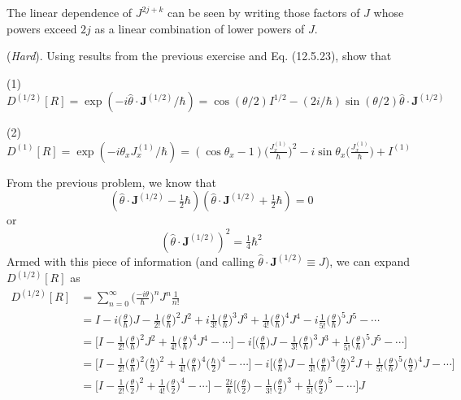 \documentclass[../principles-of-quantum-mechanics.tex]{subfiles}
\begin{document}
\begin{questions}
\begin{solution}
			The linear dependence of $J^{2j + k}$ can be seen by writing those factors of $J$ whose powers exceed $2j$ as a linear combination of lower powers of $J$.
		\end{solution}
		
		\question (\textit{Hard}). Using results from the previous exercise and Eq. (12.5.23), show that
		
		(1) $D^{(1/2)}[R] = \exp(-i\hat{\theta}\cdot\mathbf{J}^{(1/2)}/\hbar) = \cos(\theta/2)I^{1/2} - (2i/\hbar)\sin(\theta/2)\hat{\theta}\cdot\mathbf{J}^{(1/2)}$
		
		(2) $D^{(1)}[R] = \exp(-i\theta_xJ_x^{(1)}/\hbar) = (\cos\theta_x - 1)\Big(\frac{J_x^{(1)}}{\hbar}\Big)^2 - i\sin\theta_x\Big(\frac{J_x^{(1)}}{\hbar}\Big) + I^{(1)}$
		
		\begin{solution}
			From the previous problem, we know that
			$$(\hat{\theta}\cdot\mathbf{J}^{(1/2)} - \tfrac{1}{2}\hbar)(\hat{\theta}\cdot\mathbf{J}^{(1/2)} + \tfrac{1}{2}\hbar) = 0$$
			or
			$$(\hat{\theta}\cdot\mathbf{J}^{(1/2)})^2 = \tfrac{1}{4}\hbar^2$$
			Armed with this piece of information (and calling $\hat{\theta}\cdot\mathbf{J}^{(1/2)} \equiv J$), we can expand $D^{(1/2)}[R]$ as
			\begin{align*}
				D^{(1/2)}[R] &= \sum_{n=0}^{\infty}\Big({\frac{-i\theta}{\hbar}}\Big)^nJ^n\frac{1}{n!} \\
				&= I - i\Big(\frac{\theta}{\hbar}\Big)J - \frac{1}{2!}\Big(\frac{\theta}{\hbar}\Big)^2J^2 + i\frac{1}{3!}\Big(\frac{\theta}{\hbar}\Big)^3J^3 + \frac{1}{4!}\Big(\frac{\theta}{\hbar}\Big)^4J^4 - i\frac{1}{5!}\Big(\frac{\theta}{\hbar}\Big)^5J^5 - \cdots \\
				&= \Big[I - \frac{1}{2!}\Big(\frac{\theta}{\hbar}\Big)^2J^2 + \frac{1}{4!}\Big(\frac{\theta}{\hbar}\Big)^4J^4 - \cdots\Big] - i\Big[\Big(\frac{\theta}{\hbar}\Big)J - \frac{1}{3!}\Big(\frac{\theta}{\hbar}\Big)^3J^3 + \frac{1}{5!}\Big(\frac{\theta}{\hbar}\Big)^5J^5 - \cdots\Big] \\
				&= \Big[I - \frac{1}{2!}\Big(\frac{\theta}{\hbar}\Big)^2\Big(\frac{\hbar}{2}\Big)^2 + \frac{1}{4!}\Big(\frac{\theta}{\hbar}\Big)^4\Big(\frac{\hbar}{2}\Big)^4 - \cdots\Big] - i\Big[\Big(\frac{\theta}{\hbar}\Big)J - \frac{1}{3!}\Big(\frac{\theta}{\hbar}\Big)^3\Big(\frac{\hbar}{2}\Big)^2J + \frac{1}{5!}\Big(\frac{\theta}{\hbar}\Big)^5\Big(\frac{\hbar}{2}\Big)^4J - \cdots\Big] \\
				&= \Big[I - \frac{1}{2!}\Big(\frac{\theta}{2}\Big)^2 + \frac{1}{4!}\Big(\frac{\theta}{2}\Big)^4 - \cdots\Big] - \frac{2i}{\hbar}\Big[\Big(\frac{\theta}{2}\Big) - \frac{1}{3!}\Big(\frac{\theta}{2}\Big)^3 + \frac{1}{5!}\Big(\frac{\theta}{2}\Big)^5 - \cdots \Big]J \\

\end{align*}
\end{solution}
\end{questions}
\end{document}
